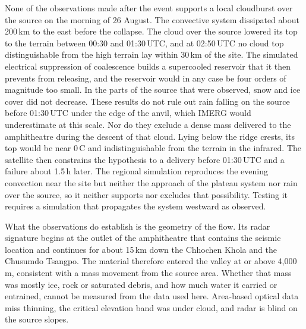 \documentclass{nature}
\begin{document}
None of the observations made after the event supports a local cloudburst over the source on the morning of 26 August. The convective system dissipated about 200\,km to the east before the collapse. The cloud over the source lowered its top to the terrain between 00:30 and 01:30\,UTC, and at 02:50\,UTC no cloud top distinguishable from the high terrain lay within 30\,km of the site. The simulated electrical suppression of coalescence builds a supercooled reservoir that it then prevents from releasing, and the reservoir would in any case be four orders of magnitude too small. In the parts of the source that were observed, snow and ice cover did not decrease. These results do not rule out rain falling on the source before 01:30\,UTC under the edge of the anvil, which IMERG would underestimate at this scale. Nor do they exclude a dense mass delivered to the amphitheatre during the descent of that cloud. Lying below the ridge crests, its top would be near 0\,\textdegree C and indistinguishable from the terrain in the infrared. The satellite then constrains the hypothesis to a delivery before 01:30\,UTC and a failure about 1.5\,h later. The regional simulation reproduces the evening convection near the site but neither the approach of the plateau system nor rain over the source, so it neither supports nor excludes that possibility. Testing it requires a simulation that propagates the system westward as observed.

What the observations do establish is the geometry of the flow. Its radar signature begins at the outlet of the amphitheatre that contains the seismic location and continues for about 15\,km down the Chhochen Khola and the Chusumdo Tsangpo. The material therefore entered the valley at or above 4,000\,m, consistent with a mass movement from the source area\cite{shugar2021,ekstrom2013}. Whether that mass was mostly ice, rock or saturated debris, and how much water it carried or entrained, cannot be measured from the data used here. Area-based optical data miss thinning, the critical elevation band was under cloud, and radar is blind on the source slopes.
\end{document}
